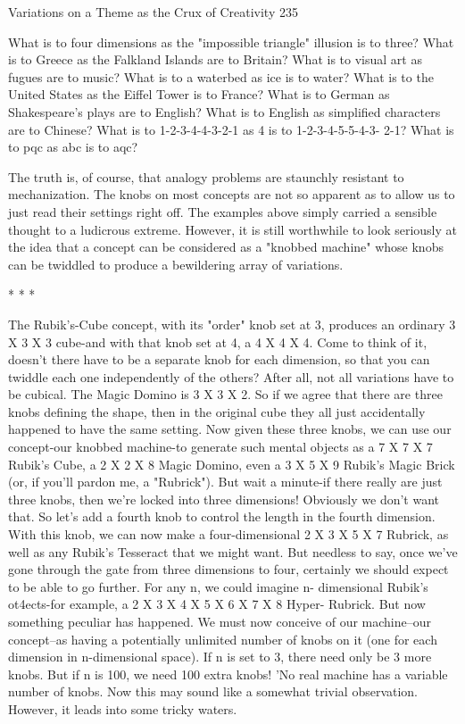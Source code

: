 Variations on a Theme as the Crux of Creativity                                     235

  What is to four dimensions as the "impossible triangle" illusion is to three?
  What is to Greece as the Falkland Islands are to Britain? What is to visual art as
  fugues are to music?
  What is to a waterbed as ice is to water?
  What is to the United States as the Eiffel Tower is to France? What is to
  German as Shakespeare's plays are to English? What is to English as simplified
  characters are to Chinese? What is to 1-2-3-4-4-3-2-1 as 4 is to 1-2-3-4-5-5-4-3-
  2-1? What is to pqc as abc is to aqc?

The truth is, of course, that analogy problems are staunchly resistant to
mechanization. The knobs on most concepts are not so apparent as to allow us to just
read their settings right off. The examples above simply carried a sensible thought to a
ludicrous extreme. However, it is still worthwhile to look seriously at the idea that a
concept can be considered as a "knobbed machine" whose knobs can be twiddled to
produce a bewildering array of variations.

                                       *   *   *

        The Rubik's-Cube concept, with its "order" knob set at 3, produces an ordinary
3 X 3 X 3 cube-and with that knob set at 4, a 4 X 4 X 4. Come to think of it, doesn't
there have to be a separate knob for each dimension, so that you can twiddle each one
independently of the others? After all, not all variations have to be cubical. The Magic
Domino is 3 X 3 X 2. So if we agree that there are three knobs defining the shape,
then in the original cube they all just accidentally happened to have the same setting.
Now given these three knobs, we can use our concept-our knobbed machine-to
generate such mental objects as a 7 X 7 X 7 Rubik's Cube, a 2 X 2 X 8 Magic
Domino, even a 3 X 5 X 9 Rubik's Magic Brick (or, if you'll pardon me, a "Rubrick").
But wait a minute-if there really are just three knobs, then we're locked into three
dimensions! Obviously we don't want that. So let's add a fourth knob to control the
length in the fourth dimension. With this knob, we can now make a four-dimensional
2 X 3 X 5 X 7 Rubrick, as well as any Rubik's Tesseract that we might want. But
needless to say, once we've gone through the gate from three dimensions to four,
certainly we should expect to be able to go further. For any n, we could imagine n-
dimensional Rubik's ot4ects-for example, a 2 X 3 X 4 X 5 X 6 X 7 X 8 Hyper-
Rubrick. But now something peculiar has happened. We must now conceive of our
machine--our concept--as having a potentially unlimited number of knobs on it (one
for each dimension in n-dimensional space). If n is set to 3, there need only be 3 more
knobs. But if n is 100, we need 100 extra knobs!
        'No real machine has a variable number of knobs. Now this may sound like
a somewhat trivial observation. However, it leads into some tricky waters.




